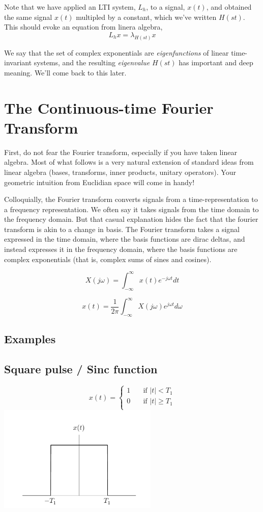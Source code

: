 Note that we have applied an LTI system, $L_h$, to a signal, $x(t)$, and
obtained the same signal $x(t)$ multipled by a constant, which we've written $H(st)$. This should evoke an equation from linera algebra,
\[
L_h x = \lambda_{H(st)} x
\]

We say that the set of complex exponentials are \textit{eigenfunctions} of
linear time-invariant systems, and the resulting \textit{eigenvalue} $H(st)$ 
has important and deep meaning. We'll come back to this later.

\section{The Continuous-time Fourier Transform}
First, do not fear the Fourier transform, especially if you have
taken linear algebra. Most of what follows is a very natural extension
of standard ideas from linear algebra (bases, transforms, inner products,
unitary operators). Your geometric intuition from Euclidian space
will come in handy! 


Colloquially, the Fourier transform converts signals from a
time-representation to a frequency representation. We often say it
takes signals from the time domain to the frequency domain. But that
casual explanation hides the fact that the fourier transform is akin
to a change in basis. The Fourier transform takes a signal expressed
in the time domain, where the basis functions are dirac deltas, and
instead expresses it in the frequency domain, where the basis
functions are complex exponentials (that is, complex sums of sines and
cosines).

\[
X(j\omega) = \int_{-\infty}^{\infty} x(t) e^{-j\omega t} dt
\]

\[
x(t) = \frac{1}{2\pi}\int_{-\infty}^{\infty} X(j\omega) e^{j \omega t} d\omega
\]


\subsection{Examples}
\subsection{Square pulse / Sinc function}

\[ x(t) =
  \begin{cases}
    1  & \quad \text{if } |t| < T_1\\
    0  & \quad \text{if }  |t| \geq T_1 \\
  \end{cases}
\]
\includegraphics[width=3in]{notes.02.square.pdf}



